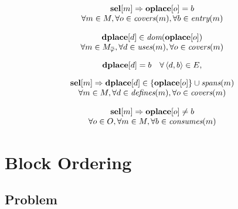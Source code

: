\begin{equation}
  \begin{array}{c}
    \mVar{sel}[m] \mImp \mVar{oplace}[o] = b \\
    \forall m \in \mMatchSet,
    \forall o \in \mCovers(m),
    \forall b \in \mEntry(m)
  \end{array}
  \labelEquation{jump-placements}
\end{equation}

\begin{equation}
  \begin{array}{c}
    \mVar{dplace}[d] \in \mDom(\mVar{oplace}[o]) \\
    \forall m \in \mMatchCompSet{\mPhi},
    \forall d \in \mUses(m),
    \forall o \in \mCovers(m)
  \end{array}
  \labelEquation{dom}
\end{equation}

\begin{equation}
  \mVar{dplace}[d] = b
  \mQuantSep
  \forall \mUnDirEdge{d}{b} \in \mDefEdgeSet,
  \labelEquation{def-edges}
\end{equation}

\begin{equation}
  \begin{array}{c}
    \mVar{sel}[m]
    \mImp
    \mVar{dplace}[d] \in \mSet{\mVar{oplace}[o]} \cup \mSpans(m) \\
    \forall m \in \mMatchSet,
    \forall d \in \mDefines(m),
    \forall o \in \mCovers(m)
  \end{array}
  \labelEquation{spanning}
\end{equation}

\begin{equation}
  \begin{array}{c}
    \mVar{sel}[m]
    \mImp
    \mVar{oplace}[o] \neq b \\
    \forall o \in \mOpSet,
    \forall m \in \mMatchSet,
    \forall b \in \mConsumes(m)
  \end{array}
  \labelEquation{consumption}
\end{equation}



\section{Block Ordering}
\subsection{Problem}
